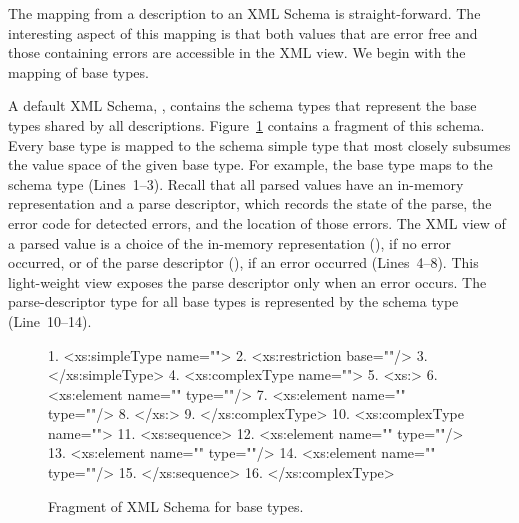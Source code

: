 The mapping from a \pads{} description to an XML Schema is 
straight-forward.  The interesting aspect of this mapping is that both
\pads{} values that are error free and those containing errors are
accessible in the XML view.  We begin with the mapping of \pads{} base
types. 

A default XML Schema, , contains the schema types that
represent the \pads{} base types shared by all \pads{} descriptions.
Figure~\ref{figure:pads.xsd} contains a fragment of this schema.
Every \pads{} base type is mapped to the schema simple type that most
closely subsumes the value space of the given \pads{} base type.  For example,
the  base type maps to the schema type 
(Lines~1--3).  Recall that all parsed \pads{} values have an in-memory
representation and a parse descriptor, which records the state of the
parse, the error code for detected errors, and the location of those
errors.  The XML view of a parsed value is a choice of the in-memory
representation (), if no error occurred, or of the parse
descriptor (), if
an error occurred (Lines~4--8).  This light-weight view exposes the
parse descriptor only when an error occurs.  The parse-descriptor type
for all base types is represented by the schema type
 (Line~10--14).

\begin{figure}
\begin{small}
\begin{code}
 1. <xs:simpleType name="">
 2.  <xs:restriction base=""/>
 3. </xs:simpleType>
 4. <xs:complexType name="">
 5.  <xs:>
 6.   <xs:element name="" type=""/>
 7.   <xs:element name=""  type=""/>
 8.  </xs:>
 9. </xs:complexType>
{10}. <xs:complexType name="">
{11}.  <xs:sequence>
{12}.   <xs:element name=""  type=""/>
{13}.   <xs:element name="" type=""/>
{14}.   <xs:element name=""     type=""/>
{15}.  </xs:sequence>
{16}. </xs:complexType>
\end{code}
\end{small}
\caption{Fragment of XML Schema for \pads{} base types.}
\label{figure:pads.xsd}
\end{figure}

